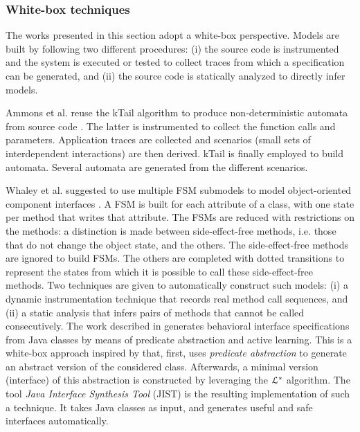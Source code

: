 \subsubsection{White-box techniques}
\label{sec:passive-white}

The works presented in this section adopt a white-box
perspective. Models are built by following two different
procedures: (i) the source code is instrumented and the system is
executed or tested to collect traces from which a specification
can be generated, and (ii) the source code is statically analyzed
to directly infer models.

Ammons et al. reuse the kTail algorithm to produce
non-deterministic automata from source code
\cite{Ammons:2002:MS:565816.503275}. The latter is instrumented
to collect the function calls and parameters.  Application traces
are collected and scenarios (small sets of interdependent
interactions) are then derived. kTail is finally employed to
build automata. Several automata are generated from the different
scenarios.

Whaley et al. suggested to use multiple FSM submodels to model
object-oriented component interfaces
\cite{Whaley:2002:AEO:566171.566212}. A FSM is built for each
attribute of a class, with one state per method that writes that
attribute. The FSMs are reduced with restrictions on the methods:
a distinction is made between side-effect-free methods, i.e. those
that do not change the object state, and the others. The
side-effect-free methods are ignored to build FSMs. The others are
completed with dotted transitions to represent the states
from which it is possible to call these side-effect-free methods.
Two techniques are given to automatically construct such models:
(i) a dynamic instrumentation technique that records real method call
sequences, and (ii) a static analysis that infers pairs of
methods that cannot be called consecutively. The work described
in \cite{Alur:2005:SIS:1047659.1040314} generates behavioral
interface specifications from Java classes by means of predicate
abstraction and active learning. This is a white-box approach
inspired by \cite{Whaley:2002:AEO:566171.566212} that, first,
uses \textit{predicate abstraction} to generate an abstract
version of the considered class. Afterwards, a minimal version
(interface) of this abstraction is constructed by leveraging the
$\EuScript{L}^*$ algorithm. The tool \textit{Java Interface
Synthesis Tool} (JIST) is the resulting implementation of such a
technique. It takes Java classes as input, and generates useful
and safe interfaces automatically.

